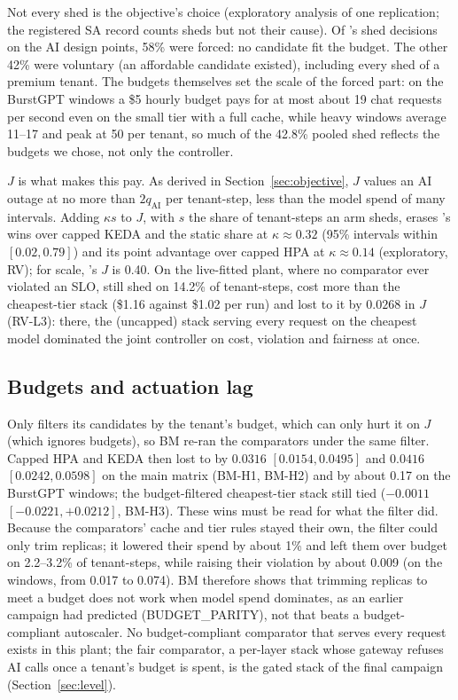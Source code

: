 Not every shed is the objective's choice (exploratory analysis of one
replication; the registered SA record counts sheds but not their cause). Of
\jcac{}'s shed decisions on
the AI design points, 58\% were forced: no candidate fit the budget. The
other 42\% were voluntary (an affordable candidate existed), including every
shed of a premium tenant. The budgets themselves set the scale of the
forced part: on the BurstGPT windows a \$5 hourly budget pays for at most
about 19 chat requests per second even on the small tier with a full cache,
while heavy windows average 11--17 and peak at 50 per tenant, so much of the
42.8\% pooled shed reflects the budgets we chose, not only the controller.

$J$ is what makes this pay. As derived in Section~\ref{sec:objective}, $J$
values an AI outage at no more than $2q_{\mathrm{AI}}$ per tenant-step,
less than the model spend of many intervals. Adding $\kappa s$ to $J$, with
$s$ the share of tenant-steps an arm sheds, erases \jcac{}'s wins over
capped KEDA and the static share at $\kappa\approx0.32$ (95\% intervals
within $[0.02,0.79]$) and its point advantage over capped HPA at
$\kappa\approx0.14$ (exploratory, RV); for scale, \jcac{}'s $J$ is 0.40. On the
live-fitted plant, where no comparator ever violated an SLO, \jcac{} still
shed on 14.2\% of tenant-steps, cost more than the cheapest-tier stack
(\$1.16 against \$1.02 per run) and lost to it by $0.0268$ in $J$ (RV-L3):
there, the (uncapped) stack serving every request on the cheapest model
dominated the joint controller on cost, violation and fairness at once.

\subsection{Budgets and actuation lag}
\label{sec:budget}

Only \jcac{} filters its candidates by the tenant's budget, which can only
hurt it on $J$ (which ignores budgets), so BM re-ran the comparators under
the same filter. Capped HPA and KEDA then lost to \jcac{} by $0.0316$
$[0.0154,0.0495]$ and $0.0416$ $[0.0242,0.0598]$ on the main matrix
(BM-H1, BM-H2) and by about 0.17 on the BurstGPT windows; the
budget-filtered cheapest-tier stack still tied ($-0.0011$
$[-0.0221,+0.0212]$, BM-H3). These wins must be read for what the filter
did. Because the comparators' cache and tier rules stayed their own, the
filter could only trim replicas; it lowered their spend by about 1\% and
left them over budget on 2.2--3.2\% of tenant-steps, while raising their
violation by about 0.009 (on the windows, from 0.017 to 0.074). BM therefore
shows that trimming replicas to meet a budget does not work when model
spend dominates, as an earlier campaign had predicted
(BUDGET\_PARITY), not that \jcac{} beats a budget-compliant autoscaler.
No budget-compliant comparator that serves every request exists in this
plant; the fair comparator, a per-layer stack whose gateway refuses AI
calls once a tenant's budget is spent, is the gated stack of the final
campaign (Section~\ref{sec:level}).

